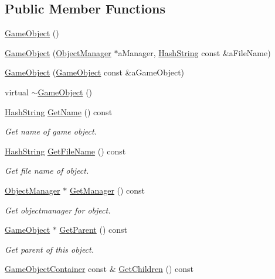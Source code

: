 \subsection*{Public Member Functions}
\begin{DoxyCompactItemize}
\item 
\hyperlink{classGameObject_a0348e3ee2e83d56eafca7a3547f432c4}{Game\+Object} ()
\item 
\hyperlink{classGameObject_a40c2bb154101ca6885b5efd019c0167b}{Game\+Object} (\hyperlink{classObjectManager}{Object\+Manager} $\ast$a\+Manager, \hyperlink{classHashString}{Hash\+String} const \&a\+File\+Name)
\item 
\hyperlink{classGameObject_a7636733e496960189f931aa9b2474c7f}{Game\+Object} (\hyperlink{classGameObject}{Game\+Object} const \&a\+Game\+Object)
\item 
virtual \hyperlink{classGameObject_ab82dfdb656f9051c0587e6593b2dda97}{$\sim$\+Game\+Object} ()
\item 
\hyperlink{classHashString}{Hash\+String} \hyperlink{classGameObject_a8736428fdc25165b44e5cbd06b3e2e6d}{Get\+Name} () const 
\begin{DoxyCompactList}\small\item\em Get name of game object. \end{DoxyCompactList}\item 
\hyperlink{classHashString}{Hash\+String} \hyperlink{classGameObject_a94d0fc9225e3fa7b47cf4fd4c2c10efc}{Get\+File\+Name} () const 
\begin{DoxyCompactList}\small\item\em Get file name of object. \end{DoxyCompactList}\item 
\hyperlink{classObjectManager}{Object\+Manager} $\ast$ \hyperlink{classGameObject_a46633c3a227d6ef193bfe89f8d96c465}{Get\+Manager} () const 
\begin{DoxyCompactList}\small\item\em Get objectmanager for object. \end{DoxyCompactList}\item 
\hyperlink{classGameObject}{Game\+Object} $\ast$ \hyperlink{classGameObject_a0b6ff273dc4388d22d5a3fd2d40eee5c}{Get\+Parent} () const 
\begin{DoxyCompactList}\small\item\em Get parent of this object. \end{DoxyCompactList}\item 
\hyperlink{classGameObject_aeef18cd85b020970fc7e33bb1d0f834e}{Game\+Object\+Container} const \& \hyperlink{classGameObject_ac0c12ac37dc026c53896906075b5d450}{Get\+Children} () const 

\end{DoxyCompactItemize}
